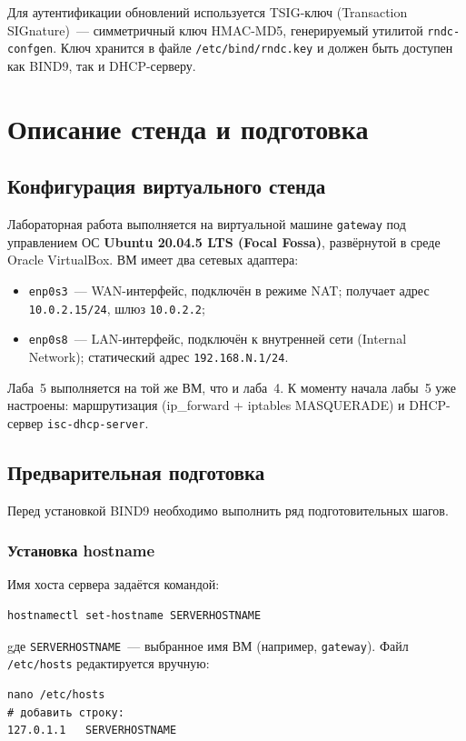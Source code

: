 \documentclass[a4paper,14pt,oneside,openany]{memoir}
\begin{document}
Для аутентификации обновлений используется TSIG-ключ (Transaction SIGnature)~--- симметричный ключ HMAC-MD5, генерируемый утилитой \texttt{rndc-confgen}. Ключ хранится в файле \texttt{/etc/bind/rndc.key} и должен быть доступен как BIND9, так и DHCP-серверу.

\chapter{Описание стенда и подготовка}
\label{ch:stand}

\section{Конфигурация виртуального стенда}

Лабораторная работа выполняется на виртуальной машине \texttt{gateway} под управлением ОС \textbf{Ubuntu 20.04.5 LTS (Focal Fossa)}, развёрнутой в среде Oracle VirtualBox. ВМ имеет два сетевых адаптера:
\begin{itemize}
    \item \texttt{enp0s3}~--- WAN-интерфейс, подключён в режиме NAT; получает адрес \texttt{10.0.2.15/24}, шлюз \texttt{10.0.2.2};
    \item \texttt{enp0s8}~--- LAN-интерфейс, подключён к внутренней сети (Internal Network); статический адрес \texttt{192.168.N.1/24}.
\end{itemize}

Лаба~5 выполняется на той же ВМ, что и лаба~4. К моменту начала лабы~5 уже настроены: маршрутизация (ip\_forward + iptables MASQUERADE) и DHCP-сервер \texttt{isc-dhcp-server}.

\section{Предварительная подготовка}

Перед установкой BIND9 необходимо выполнить ряд подготовительных шагов.

\subsection{Установка hostname}

Имя хоста сервера задаётся командой:
\begin{lstlisting}
hostnamectl set-hostname SERVERHOSTNAME
\end{lstlisting}
gде \texttt{SERVERHOSTNAME}~--- выбранное имя ВМ (например, \texttt{gateway}). Файл \texttt{/etc/hosts} редактируется вручную:
\begin{lstlisting}
nano /etc/hosts
# добавить строку:
127.0.1.1   SERVERHOSTNAME
\end{lstlisting}
\end{document}
